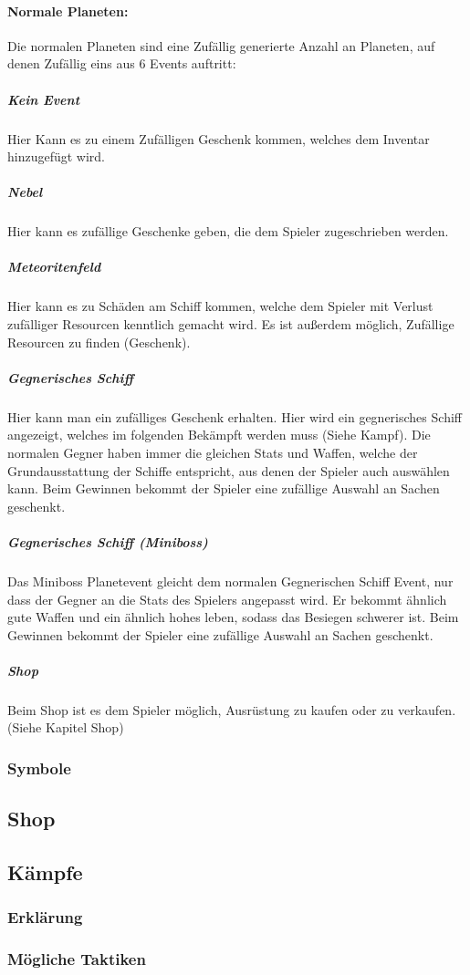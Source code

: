 \documentclass[fontsize=12pt,paper=a4,twoside]{scrartcl}
\begin{document}
\paragraph{Normale Planeten: }
Die normalen Planeten sind eine Zufällig generierte Anzahl an Planeten, auf denen Zufällig eins aus 6 Events auftritt:

\subparagraph{Kein Event} Hier Kann es zu einem Zufälligen Geschenk kommen, welches dem Inventar hinzugefügt wird. 
\subparagraph{Nebel} Hier kann es zufällige Geschenke geben, die dem Spieler zugeschrieben werden.
\subparagraph{Meteoritenfeld} Hier kann es zu Schäden am Schiff kommen, welche dem Spieler mit Verlust zufälliger Resourcen kenntlich gemacht wird. Es ist außerdem möglich, Zufällige Resourcen zu finden (Geschenk).
\subparagraph{Gegnerisches Schiff} Hier kann man ein zufälliges Geschenk erhalten. Hier wird ein gegnerisches Schiff angezeigt, welches im folgenden Bekämpft werden muss (Siehe Kampf). Die normalen Gegner haben immer die gleichen Stats und Waffen, welche der Grundausstattung der Schiffe entspricht, aus denen der Spieler auch auswählen kann. Beim Gewinnen bekommt der Spieler eine zufällige Auswahl an Sachen geschenkt. 
\subparagraph{Gegnerisches Schiff (Miniboss)} Das Miniboss Planetevent gleicht dem normalen Gegnerischen Schiff Event, nur dass der Gegner an die Stats des Spielers angepasst wird. Er bekommt ähnlich gute Waffen und ein ähnlich hohes leben, sodass das Besiegen schwerer ist. Beim Gewinnen bekommt der Spieler eine zufällige Auswahl an Sachen geschenkt. 
\subparagraph{Shop} Beim Shop ist es dem Spieler möglich, Ausrüstung zu kaufen oder zu verkaufen. (Siehe Kapitel Shop)

\subsubsection{Symbole}


\subsection{Shop}


\subsection{Kämpfe}

\subsubsection{Erklärung}

\subsubsection{Mögliche Taktiken}
\end{document}
